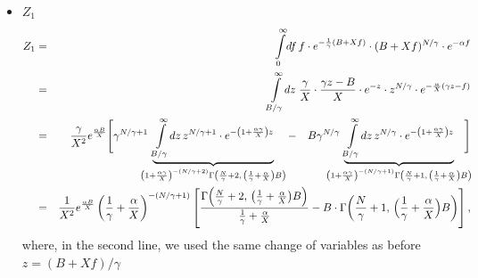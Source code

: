 \documentclass[letter,10pt,oneside]{article}
\newcommand{\ba}{\begin{eqnarray*}}
\newcommand{\ea}{\end{eqnarray*}}
\newcommand{\+}{^\dagger}
\begin{document}
\begin{appendix}
\begin{itemize}
  \item $Z_1$
  \ba
    Z_1 &=& \intop_0^\infty \! df \, f\cdot e^{-\frac{1}{\gamma}(B + Xf)} \cdot (B + Xf)^{N/\gamma} \cdot e^{-\alpha f}
    \\
    &=& 
    \intop_{B/\gamma}^\infty \! dz\; \frac{\gamma}{X} \cdot \frac{\gamma z - B}{X}\cdot e^{-z}\cdot z^{N/\gamma} \cdot e^{-\frac{\alpha}{X}(\gamma z - f)}
    \\
    &=& 
    \frac{\gamma}{X^2} e^\frac{\alpha B}{X} 
    \Bigg[
      \gamma^{N/\gamma + 1} 
      \hspace{-0.3cm}
      \underbrace{
        \intop_{B/\gamma}^\infty\!dz \, z^{N/\gamma + 1} \cdot e^{-\left(1 + \frac{\alpha\gamma}{X}\right)z}
      }_{
        \left(1 + \frac{\alpha\gamma}{X}\right)^{-(N/\gamma + 2)} \Gamma\left(\frac{N}{\gamma} + 2,\, \left(\frac{1}{\gamma} + \frac{\alpha}{X}\right)B\right)
      } 
      -\quad  
      B\gamma^{N/\gamma}
      \hspace{-0.5cm}
      \underbrace{
        \intop_{B/\gamma}^\infty\!dz \, z^{N/\gamma} \cdot e^{-\left(1 + \frac{\alpha\gamma}{X}\right)z}
      }_{
        \left(1 + \frac{\alpha\gamma}{X}\right)^{-(N/\gamma + 1)} \Gamma\left(\frac{N}{\gamma} + 1,\, \left(\frac{1}{\gamma} + \frac{\alpha}{X}\right)B\right)
      }
    \hspace{-0.3cm}
    \Bigg]
    \\
    &=&
    \frac{1}{X^2} e^{\frac{\alpha B}{X}}\left(\frac{1}{\gamma} + \frac{\alpha}{X}\right)^{-(N/\gamma + 1)} \left[\frac{\Gamma\!\left(\frac{N}{\gamma} + 2,\,\big(\frac{1}{\gamma} + \frac{\alpha}{X}\big)B\right)}{\frac{1}{\gamma} + \frac{\alpha}{X}} - B\cdot\Gamma\!\left(\frac{N}{\gamma} + 1,\,\Big(\frac{1}{\gamma} + \frac{\alpha}{X}\Big)B\right)\right] ,
  \ea
  where, in the second line, we used the same change of variables as before $z = (B+Xf) / \gamma$


\end{itemize}
\end{appendix}
\end{document}
